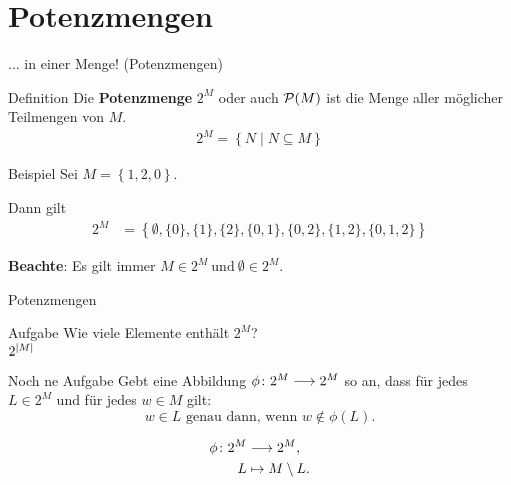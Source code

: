 \section{Potenzmengen}

\begin{frame}{... in einer Menge! (Potenzmengen)}
	\begin{block}{Definition}
		Die \textbf{Potenzmenge} $2^M$ oder auch $\mathcal{P} (M)$ ist die Menge aller möglicher Teilmengen von $M$. 
		\begin{align*}
			2^M = \left\{ N \mid N \subseteq M \right\}
		\end{align*}
	\end{block}
	\pause
	
	\begin{block}{Beispiel}
		Sei $M = \left\{ 1,2,0 \right\} $. \\ \pause
		
		Dann gilt  
		\begin{align*}   
		2^M &= \left\{ \emptyset, \{ 0 \}, \{ 1 \}, \{ 2 \}, \{ 0,1 \} , \{ 0,2 \}, \{ 1,2 \}, \{ 0,1,2 \} \right\}
		\end{align*}
		
		\textbf{Beachte}: Es gilt immer $M \in 2^M \ \text{und} \ \emptyset \in 2^M$.
	\end{block}
	
\end{frame}

\begin{frame}{Potenzmengen}
	\begin{block}{Aufgabe}
		Wie viele Elemente enthält $2^M$? \\[0.5em]
		
		\pause
		$2^{\lvert M \rvert}$
	\end{block}
	
	\pause
	\begin{block}{Noch ne Aufgabe}
		Gebt eine Abbildung $\phi \colon 2^{M} \longrightarrow 2^{M}$ so an,
		dass für jedes $L \in 2^{M}$ und für jedes $w \in M$ gilt:
		\begin{equation*}
			w \in L \text{ genau dann, wenn } w \notin \phi(L).
		\end{equation*}
		
		\pause
		\begin{align*}
			\phi \colon 2^{M} &\longrightarrow 2^{M},\\
			L &\mapsto M \setminus L.
		\end{align*}
	\end{block}

\end{frame}

